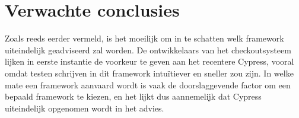 \section{Verwachte conclusies}
\label{sec:verwachte_conclusies}

Zoals reeds eerder vermeld, is het moeilijk om in te schatten welk framework uiteindelijk geadviseerd zal worden. De ontwikkelaars van het checkoutsysteem lijken in eerste instantie de voorkeur te geven aan het recentere Cypress, vooral omdat testen schrijven in dit framework intuïtiever en sneller zou zijn. In welke mate een framework aanvaard wordt is vaak de doorslaggevende factor om een bepaald framework te kiezen, en het lijkt dus aannemelijk dat Cypress uiteindelijk opgenomen wordt in het advies.


